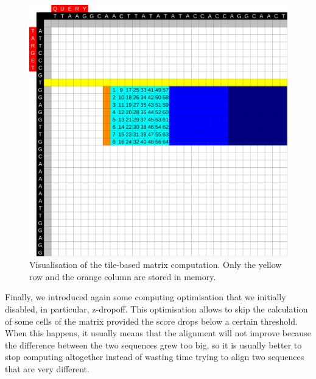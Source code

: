 \begin{figure}[h!]
	\centering
	\includegraphics[width=0.9\linewidth]{visualisation-aid-tile}
	\caption{Visualisation of the tile-based matrix computation. Only the yellow row and the orange column are stored in memory.}
	\label{fig:visualisation-aid-tile}
\end{figure}


Finally, we introduced again some computing optimisation that we initially disabled, in particular, z-dropoff. This optimisation allows to skip the calculation of some cells of the matrix provided the score drops below a certain threshold. When this happens, it usually means that the alignment will not improve because the difference between the two sequences grew too big, so it is usually better to stop computing altogether instead of wasting time trying to align two sequences that are very different.

